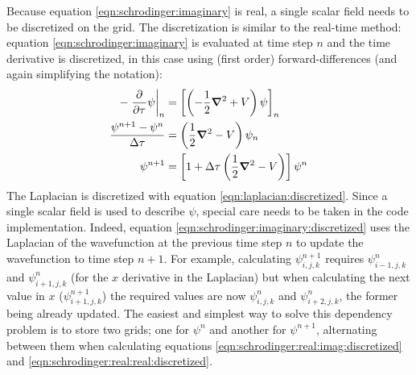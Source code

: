 Because equation \eqref{eqn:schrodinger:imaginary} is real, a single scalar
field needs to be discretized on the grid. The discretization is similar to the
real-time method: equation \eqref{eqn:schrodinger:imaginary} is evaluated at
time step $n$ and the time derivative is discretized, in this case using (first
order) forward-differences (and again simplifying the notation):
\begin{align}
- \left. \frac{\partial^{{}} }{\partial {\tau}^{{}}} \psi \right|_{n}
    & = \left[  \left( -\frac{1}{2} \bm{\nabla}^2 + V \right) \psi  \right]_{n}
\\
\frac{\psi^{n+1} - \psi^{n}}{\Delta \tau}
    & = \left( \frac{1}{2} \bm{\nabla}^2 - V \right) \psi_{n}
\\
\psi^{n+1} & = \left[ 1 + \Delta \tau \left( \frac{1}{2} \bm{\nabla}^2 - V \right) \right] \psi^{n}
\label{eqn:schrodinger:imaginary:discretized}
\end{align}
The Laplacian is discretized with equation \eqref{eqn:laplacian:discretized}.
Since a single scalar field is used to describe $\psi$, special care needs to
be taken in the code implementation. Indeed, equation
\eqref{eqn:schrodinger:imaginary:discretized} uses the Laplacian of the
wavefunction at the previous time step $n$ to update the wavefunction to
time step $n+1$. For example, calculating $\psi^{n+1}_{i,j,k}$ requires
$\psi^{n}_{i-1,j,k}$ and $\psi^{n}_{i+1,j,k}$ (for the $x$ derivative in the
Laplacian) but when calculating the next value in $x$ ($\psi^{n+1}_{i+1,j,k}$)
the required values are now $\psi^{n}_{i,j,k}$ and $\psi^{n}_{i+2,j,k}$, the
former being already updated. The easiest and simplest way to solve this
dependency problem is to store two grids; one for $\psi^{n}$ and another for
$\psi^{n+1}$, alternating between them when calculating equations
\eqref{eqn:schrodinger:real:imag:discretized} and
\eqref{eqn:schrodinger:real:real:discretized}.


